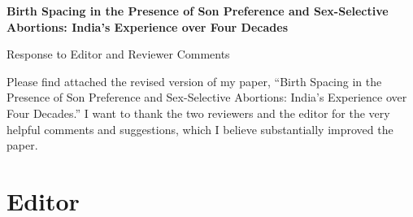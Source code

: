 \documentclass[letterpaper,12pt]{article}
\title{} \author{}
\begin{document}
\begin{center} \textbf{\large Birth Spacing in the Presence of Son
Preference and 
Sex-Selective Abortions: India's Experience over Four Decades}
\end{center}

\begin{center} Response to Editor and Reviewer Comments \end{center}

\noindent Please find attached the revised version of my paper,
``Birth Spacing in the Presence of Son Preference and Sex-Selective
Abortions:
India's Experience over Four Decades.''
I want to thank the two reviewers and the editor for the very helpful comments and 
suggestions, which I believe substantially improved the paper.

\section*{Editor}
\end{document}
